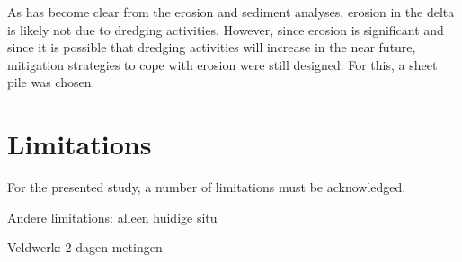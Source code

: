 As has become clear from the erosion and sediment analyses, erosion in the delta is likely not due to dredging activities. However, since erosion is significant and since it is possible that dredging activities will increase in the near future, mitigation strategies to cope with erosion were still designed. For this, a sheet pile was chosen.

\section{Limitations}
For the presented study, a number of limitations must be acknowledged.

Andere limitations: alleen huidige situ

Veldwerk: 2 dagen metingen



